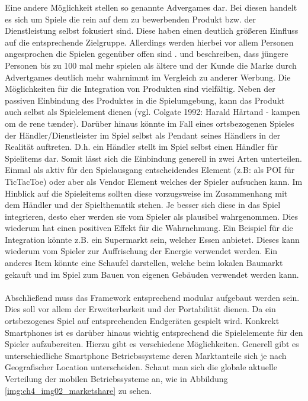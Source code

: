 Eine andere Möglichkeit stellen so genannte Advergames dar. Bei diesen handelt es sich um Spiele die rein auf dem zu bewerbenden Produkt bzw. der Dienstleistung selbst fokusiert sind. Diese haben einen deutlich größeren Einfluss auf die entsprechende Zielgruppe. Allerdings werden hierbei vor allem Personen angesprochen die Spielen gegenüber offen sind \cite{Winkler.2006}. \textcite{Chen.2001} und \textcite{Dahl.2009} beschreiben, dass jüngere Personen bis zu 100 mal mehr spielen als ältere und der Kunde die Marke durch Advertgames deutlich mehr wahrnimmt im Vergleich zu anderer Werbung.
Die Möglichkeiten für die Integration von Produkten sind vielfältig. Neben der passiven Einbindung des Produktes in die Spielumgebung, kann das Produkt auch selbst als Spielelement dienen (vgl. Colgate 1992: Harald Hårtand - kampen om de rene tænder).
Darüber hinaus könnte im Fall eines ortsbezogenen Spieles der Händler/Dienstleister im Spiel selbst als Pendant seines Händlers in der Realität auftreten. D.h. ein Händler stellt im Spiel selbst einen Händler für Spielitems dar.
Somit lässt sich die Einbindung generell in zwei Arten unterteilen. Einmal als aktiv für den Spielausgang entscheidendes Element (z.B: als POI für TicTacToe) oder aber als Vendor Element welches der Spieler aufsuchen kann.
Im Hinblick auf die Spieleitems sollten diese vorzugsweise im Zusammenhang mit dem Händler und der Spielthematik stehen. Je besser sich diese in das Spiel integrieren, desto eher werden sie vom Spieler als plausibel wahrgenommen. Dies wiederum hat einen positiven Effekt für die Wahrnehmung.
Ein Beispiel für die Integration könnte z.B. ein Supermarkt sein, welcher Essen anbietet. Dieses kann wiederum vom Spieler zur Auffrischung der Energie verwendet werden. Ein anderes Item könnte eine Schaufel darstellen, welche beim lokalen Baumarkt gekauft und im Spiel zum Bauen von eigenen Gebäuden verwendet werden kann.
\\\\
Abschließend muss das Framework entsprechend modular aufgebaut werden sein. Dies soll vor allem der Erweiterbarkeit und der Portabilität dienen. Da ein ortsbezogenes Spiel auf entsprechenden Endgeräten gespielt wird. Konkrekt Smartphones ist es darüber hinaus wichtig entsprechend die Spielelemente für den Spieler aufzubereiten. Hierzu gibt es verschiedene Möglichkeiten.
Generell gibt es unterschiedliche Smartphone Betriebssysteme deren Marktanteile sich je nach Geografischer Location unterscheiden.
Schaut man sich die globale aktuelle Verteilung der mobilen Betriebssysteme an, wie in Abbildung \ref{img:ch4_img02_marketshare} zu sehen.

